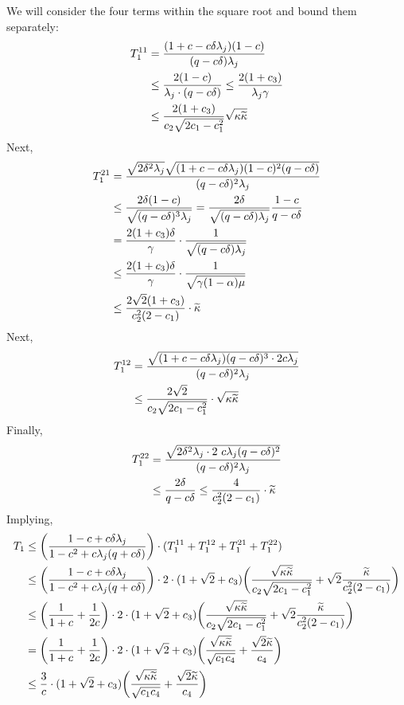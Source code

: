 We will consider the four terms within the square root and bound them separately:
\begin{align*}
T_{1}^{11}&=\frac{(1+c-c\delta\lambda_j)(1-c)}{(q -c\delta)\lambda_j}\\
&\leq\frac{2(1-c)}{\lambda_j\cdot(q -c\delta)}\leq\frac{2(1+c_3)}{\lambda_j\gamma}\\
&\leq\frac{2(1+c_3)}{c_2\sqrt{2c_1-c_1^2}}\sqrt{{\kappa}\widetilde{\kappa}}
\end{align*}
Next,
\begin{align*}
T_{1}^{21}&=\frac{\sqrt{2\delta^2\lambda_j}\sqrt{(1+c-c\delta\lambda_j)(1-c)^2(q -c\delta)}}{(q -c\delta)^2\lambda_j}\\
&\leq\frac{2\delta(1-c)}{\sqrt{(q -c\delta)^3\lambda_j}}=\frac{2\delta}{\sqrt{(q -c\delta)\lambda_j}}\frac{1-c}{q -c\delta}\\
&=\frac{2(1+c_3)\delta}{\gamma}\cdot\frac{1}{\sqrt{(q -c\delta)\lambda_j}}\\
&\leq\frac{2(1+c_3)\delta}{\gamma}\cdot\frac{1}{\sqrt{\gamma(1-\alpha)\mu}}\\
&\leq\frac{2\sqrt{2}(1+c_3)}{c_2^2(2-c_1)}\cdot\widetilde{\kappa}
\end{align*}
Next, 
\begin{align*}
T_1^{12}&=\frac{\sqrt{(1+c-c\delta\lambda_j)(q -c\delta)^3\cdot 2c\lambda_j}}{(q -c\delta)^2\lambda_j}\\
&\leq\frac{2\sqrt{2}}{c_2\sqrt{2c_1-c_1^2}}\cdot\sqrt{{\kappa}\widetilde{\kappa}}
\end{align*}
Finally, 
\begin{align*}
T_1^{22}&=\frac{\sqrt{2\delta^2\lambda_j\cdot2\ c\lambda_j(q -c\delta)^2}}{(q -c\delta)^2\lambda_j}\\
&\leq\frac{2\delta}{q -c\delta}\leq\frac{4}{c_2^2(2-c_1)}\cdot\widetilde{\kappa}
\end{align*}
Implying,
\begin{align*}
T_1&\leq\bigg(\frac{1-c+c\delta\lambda_j}{1-c^2+c\lambda_j(q +c\delta)}\bigg)\cdot(T_1^{11}+T_1^{12}+T_1^{21}+T_1^{22})\\
&\leq\bigg(\frac{1-c+c\delta\lambda_j}{1-c^2+c\lambda_j(q +c\delta)}\bigg)\cdot2\cdot(1+\sqrt{2}+c_3)\bigg(\frac{\sqrt{{\kappa}\widetilde{\kappa}}}{c_2\sqrt{2c_1-c_1^2}}+\sqrt{2}\frac{\widetilde{\kappa}}{c_2^2(2-c_1)}\bigg)\\
&\leq\bigg(\frac{1}{1+c}+\frac{1}{2c}\bigg)\cdot2\cdot(1+\sqrt{2}+c_3)\bigg(\frac{\sqrt{{\kappa}\widetilde{\kappa}}}{c_2\sqrt{2c_1-c_1^2}}+\sqrt{2}\frac{\widetilde{\kappa}}{c_2^2(2-c_1)}\bigg)\\
&=\bigg(\frac{1}{1+c}+\frac{1}{2c}\bigg)\cdot2\cdot(1+\sqrt{2}+c_3)\bigg(\frac{\sqrt{{\kappa}\widetilde{\kappa}}}{\sqrt{c_1c_4}}+\frac{\sqrt{2}\widetilde{\kappa}}{c_4}\bigg)\\
&\leq\frac{3}{c}\cdot(1+\sqrt{2}+c_3)\bigg(\frac{\sqrt{{\kappa}\widetilde{\kappa}}}{\sqrt{c_1c_4}}+\frac{\sqrt{2}\widetilde{\kappa}}{c_4}\bigg)
\end{align*}
